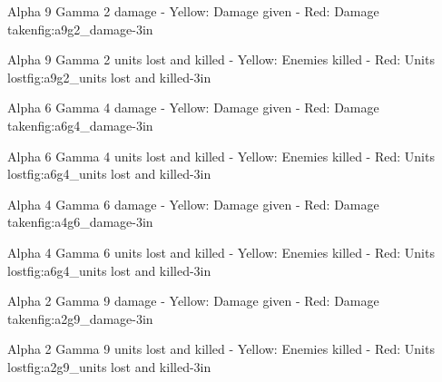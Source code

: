 			{Alpha 9 Gamma 2 damage - Yellow: Damage given - Red: Damage taken}{fig:a9g2_damage}{-3in}		
			\newpage			
%

			{Alpha 9 Gamma 2 units lost and killed - Yellow: Enemies killed - Red: Units lost}{fig:a9g2_units lost and killed}{-3in}

			\newpage
	
			
			{Alpha 6 Gamma 4 damage - Yellow: Damage given - Red: Damage taken}{fig:a6g4_damage}{-3in}

			\newpage
{}
			{Alpha 6 Gamma 4 units lost and killed - Yellow: Enemies killed - Red: Units lost}{fig:a6g4_units lost and killed}{-3in}

			\newpage
			
			
			


			{Alpha 4 Gamma 6 damage - Yellow: Damage given - Red: Damage taken}{fig:a4g6_damage}{-3in}

			\newpage
{}
			{Alpha 4 Gamma 6 units lost and killed - Yellow: Enemies killed - Red: Units lost}{fig:a6g4_units lost and killed}{-3in}

			\newpage





			{Alpha 2 Gamma 9 damage - Yellow: Damage given - Red: Damage taken}{fig:a2g9_damage}{-3in}

			\newpage
{}
			{Alpha 2 Gamma 9 units lost and killed - Yellow: Enemies killed - Red: Units lost}{fig:a2g9_units lost and killed}{-3in}

			\newpage